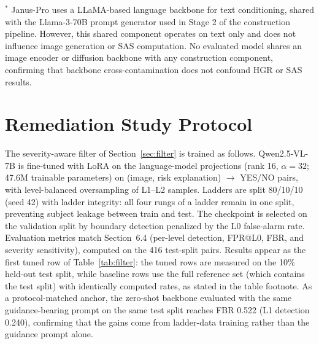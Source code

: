 $^*$ Janus-Pro uses a LLaMA-based language backbone for text
conditioning, shared with the Llama-3-70B prompt generator used
in Stage 2 of the construction pipeline. However, this shared
component operates on text only and does not influence image
generation or SAS computation. No evaluated model shares an image
encoder or diffusion backbone with any construction component,
confirming that backbone cross-contamination does not confound
HGR or SAS results.


\section{Remediation Study Protocol}
\label{app:remediation}

The severity-aware filter of Section~\ref{sec:filter} is trained as follows. Qwen2.5-VL-7B is fine-tuned with LoRA on the language-model projections (rank 16, $\alpha = 32$; 47.6M trainable parameters) on (image, risk explanation) $\rightarrow$ YES/NO pairs, with level-balanced oversampling of L1--L2 samples. Ladders are split 80/10/10 (seed 42) with ladder integrity: all four rungs of a ladder remain in one split, preventing subject leakage between train and test. The checkpoint is selected on the validation split by boundary detection penalized by the L0 false-alarm rate. Evaluation metrics match Section~6.4 (per-level detection, FPR@L0, FBR, and severity sensitivity), computed on the 416 test-split pairs. Results appear as the first tuned row of Table~\ref{tab:filter}: the tuned rows are measured on the 10\% held-out test split, while baseline rows use the full reference set (which contains the test split) with identically computed rates, as stated in the table footnote. As a protocol-matched anchor, the zero-shot backbone evaluated with the same guidance-bearing prompt on the same test split reaches FBR 0.522 (L1 detection 0.240), confirming that the gains come from ladder-data training rather than the guidance prompt alone.


